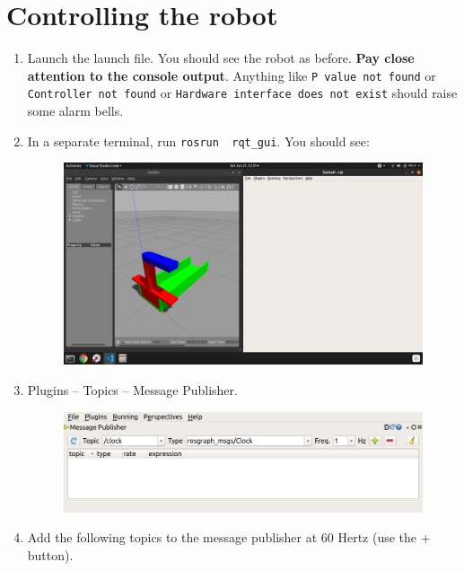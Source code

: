 \documentclass{article}
\begin{document}
    \section{Controlling the robot}
        \begin{enumerate}
            \item Launch the launch file. You should see the robot as before. \textbf{Pay close attention to the 
            console output}. Anything like \texttt{P value not found} or \texttt{Controller not found} or \texttt{Hardware 
            interface does not exist} should raise some alarm bells.
            \item In a separate terminal, run \texttt{rosrun \ rqt\_gui}. You should see:
            \begin{figure}[H]
                \center
                \includegraphics[width = \textwidth]{image_2.png}
            \end{figure}
            \item Plugins -- Topics -- Message Publisher.
            \begin{figure}[H]
                \center
                \includegraphics[width = \textwidth]{image_3.png}
            \end{figure}
            \item Add the following topics to the message publisher at 60 Hertz (use the + button). 
            \begin{itemize}

\end{itemize}
\end{enumerate}
\end{document}
